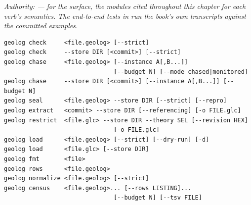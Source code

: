 \emph{Authority:  —  for the
surface, the modules cited throughout this chapter for each verb's
semantics. The end-to-end tests in 
run the book's own transcripts against the committed examples.}

\begin{Verbatim}[fontsize=\small,frame=leftline,rulecolor=\color{accentmid},framesep=3mm,xleftmargin=3mm]
geolog check     <file.geolog> [--strict]
geolog check     --store DIR [<commit>] [--strict]
geolog chase     <file.geolog> [--instance A[,B...]]
                               [--budget N] [--mode chased|monitored]
geolog chase     --store DIR [<commit>] [--instance A[,B...]] [--budget N]
geolog seal      <file.geolog> --store DIR [--strict] [--repro]
geolog extract   <commit> --store DIR [--referencing] [-o FILE.glc]
geolog restrict  <file.glc> --store DIR --theory SEL [--revision HEX]
                               [-o FILE.glc]
geolog load      <file.geolog> [--strict] [--dry-run] [-d]
geolog load      <file.glc> [--store DIR]
geolog fmt       <file>
geolog rows      <file.geolog>
geolog normalize <file.geolog> [--strict]
geolog census    <file.geolog>... [--rows LISTING]...
                               [--budget N] [--tsv FILE]
\end{Verbatim}

